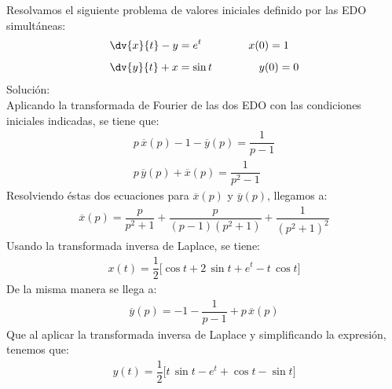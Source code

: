 \begin{ejemplo}
Resolvamos el siguiente problema de valores iniciales definido por las EDO simultáneas:
\begin{align*}
\dv{x}{t} - y &= e^{t} \hspace{1.5cm} x(0) =  1 \\[0.5em]
\dv{y}{t} + x &= \sin t \hspace{1.5cm} y(0) =  0
\end{align*}
Solución:
\\[0.5em]
Aplicando la transformada de Fourier de las dos EDO con las condiciones iniciales indicadas, se tiene que:
\begin{align*}
p \, \overline{x} (p) - 1 - \overline{y} (p) = \dfrac{1}{p -1} \\[0.5em]
p \, \overline{y} (p) + \overline{x} (p) = \dfrac{1}{p^{2} -1}
\end{align*}
Resolviendo éstas dos ecuaciones para $\overline{x}(p)$ y $\overline{y}(p)$, llegamos a:
\begin{align*}
\overline{x}(p) = \dfrac{p}{p^{2} + 1} + \dfrac{p}{(p - 1)(p^{2} + 1)} + \dfrac{1}{(p^{2} + 1)^{2}}
\end{align*}
Usando la transformada inversa de Laplace, se tiene:
\begin{align*}
x(t) = \dfrac{1}{2} \big[  \cos t + 2 \, \sin t +  e^{t} - t \, \cos t  \big]
\end{align*}
De la misma manera se llega a:
\begin{align*}
\overline{y} (p) = - 1 - \dfrac{1}{p - 1} + p \, \overline{x} (p)
\end{align*}
Que al aplicar la transformada inversa de Laplace y simplificando la expresión, tenemos que:
\begin{align*}
y(t)= \dfrac{1}{2} \big[  t \, \sin t - e^{t} + \cos t - \sin t  \big]
\end{align*}
\end{ejemplo}


